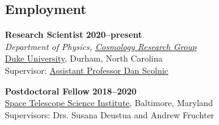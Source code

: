 \documentclass[margin]{res}
\begin{document}
\begin{resume}

\section{Employment} 

{\bf Research Scientist} \hfill {\bf 2020--present}\\
{\it Department of Physics, \href{https://phy.duke.edu/research/research-areas/astrophysics}{Cosmology Research Group}}\\
\href{https://phy.duke.edu}{Duke University}, Durham, North Carolina\\ 
Supervisor: \href{https://phy.duke.edu/people/daniel-m-scolnic}{Assistant Professor Dan Scolnic}

{\bf Postdoctoral Fellow} \hfill {\bf 2018--2020}\\
\href{http://www.stsci.edu}{Space Telescope Science Institute}, Baltimore, Maryland\\ 
Supervisors: Drs. Susana Deustua and Andrew Fruchter




 





\end{resume}
\end{document}
